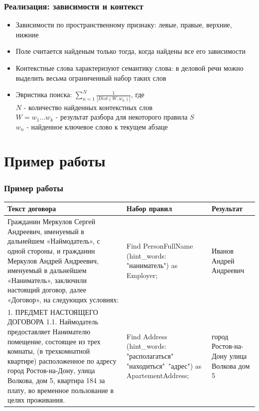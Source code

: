 \documentclass{beamer}
\begin{document}
\begin{frame}
\frametitle{Реализация: зависимости и контекст}
\begin{itemize}
	\item Зависимости по пространственному признаку: левые, правые, верхние, нижние
	\item Поле считается найденым только тогда, когда найдены все его зависимости
	\item Контекстные слова характеризуют семантику слова: в деловой речи можно выделить весьма ограниченный набор таких слов
	\item Эвристика поиска: $\sum_{n=1}^{N} \frac{1}{|Dist(W,w_n)|}$, где\\
	$N$ - количество найденных контекстных слов\\
	$W = w_1...w_k$ - результат разбора для некоторого правила $S$\\
	$w_n$ - найденное ключевое слово к текущем абзаце
\end{itemize}
\end{frame}

\section{Пример работы}
\begin{frame}[shrink=30]
\frametitle{Пример работы}
\begin{center}
\begin{tabularx}{\textwidth}{| X | X | X |}
\hline
\textbf{Текст договора} & \textbf{Набор правил} & \textbf{Результат} \\ 
\hline
Гражданин Меркулов Сергей Андреевич, именуемый в дальнейшем «Наймодатель», с одной стороны, и гражданин Меркулов Андрей Андреевич, именуемый в дальнейшем «Наниматель», заключили настоящий договор, далее «Договор»,  на следующих условиях: & Find PersonFullName (hint\_words: "наниматель") as Employer; & Иванов Андрей Андреевич \\ 
\hline
1. ПРЕДМЕТ НАСТОЯЩЕГО ДОГОВОРА
1.1. Наймодатель предоставляет Нанимателю помещение, состоящее из трех комнаты, (в трехкомнатной квартире) расположенное по адресу город Ростов-на-Дону, улица Волкова, дом 5, квартира 184 за плату, во временное пользование в целях проживания. & Find Address (hint\_words: "располагаться"\, "находиться"\, "адрес") 
as ApartementAddress; & город Ростов-на-Дону улица Волкова дом 5 \\ \hline
\end{tabularx}
\end{center}
\end{frame}
\end{document}
